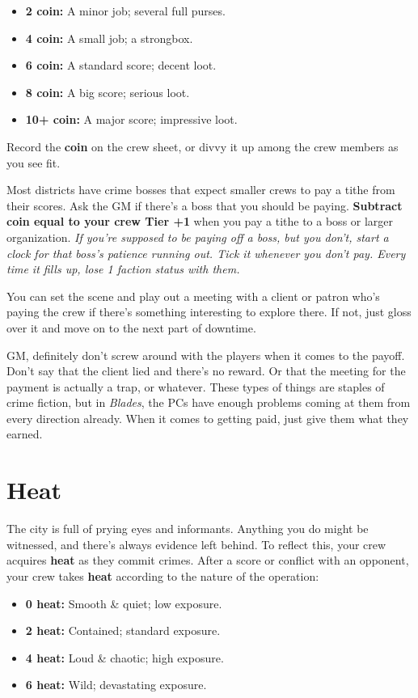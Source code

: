 \documentclass[11pt,fleqn,a5paper]{book}
\newcommand{\gameterm}[1]{\textbf{#1}}
\begin{document}
\begin{itemize}
	\item \gameterm{2 coin:}  A minor job; several full purses.
	\item \gameterm{4 coin:}  A small job; a strongbox.
	\item \gameterm{6 coin:}  A standard score; decent loot.
	\item \gameterm{8 coin:}  A big score; serious loot.
	\item \gameterm{10+ coin:}  A major score; impressive loot.
\end{itemize}

Record the \gameterm{coin}  on the crew sheet, or divvy it up among the crew members as you see fit.

Most districts have crime bosses that expect smaller crews to pay a tithe from their scores. Ask the GM if there’s a boss that you should be paying. \textbf{Subtract \gameterm{coin}  equal to your crew Tier +1} when you pay a tithe to a boss or larger organization. \emph{If you’re supposed to be paying off a boss, but you don’t, start a clock for that boss’s patience running out. Tick it whenever you don’t pay. Every time it fills up, lose 1 faction status with them.}

You can set the scene and play out a meeting with a client or patron who’s paying the crew if there’s something interesting to explore there. If not, just gloss over it and move on to the next part of downtime.

GM, definitely don’t screw around with the players when it comes to the payoff. Don’t say that the client lied and there’s no reward. Or that the meeting for the payment is actually a trap, or whatever. These types of things are staples of crime fiction, but in \emph{Blades}, the PCs have enough problems coming at them from every direction already. When it comes to getting paid, just give them what they earned.

\chapter{Heat}

The city is full of prying eyes and informants. Anything you do might be witnessed, and there’s always evidence left behind. To reflect this, your crew acquires \gameterm{heat}  as they commit crimes. After a score or conflict with an opponent, your crew takes \gameterm{heat}  according to the nature of the operation:

\begin{itemize}
	\item \gameterm{0 heat:}  Smooth \& quiet; low exposure.
	\item \gameterm{2 heat:}  Contained; standard exposure.
	\item \gameterm{4 heat: } Loud \& chaotic; high exposure.
	\item \gameterm{6 heat:}  Wild; devastating exposure.
\end{itemize}
\end{document}
